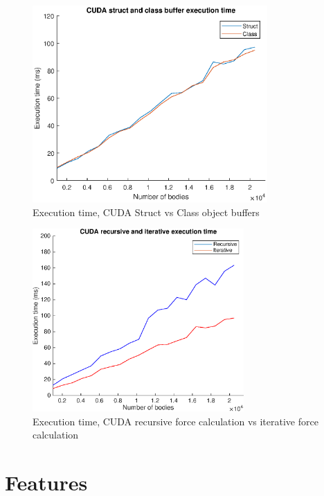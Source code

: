 \begin{figure}[H]
    \centering
    \includegraphics[width=0.8\textwidth]{Results/Figs/CUDAStructVSClass.eps}
    \caption{Execution time, CUDA Struct vs Class object buffers}
    \label{fig:GraphCUDAStructVsClass}
\end{figure}

\begin{figure}[H]
    \centering
    \includegraphics[width=0.72\textwidth]{Results/Figs/CUDARecIt.eps}
    \caption{Execution time, CUDA recursive force calculation vs iterative force calculation}
    \label{fig:CUDARecursivePerformance}
\end{figure}





\section{Features} \label{sec:ResultFeatures}

